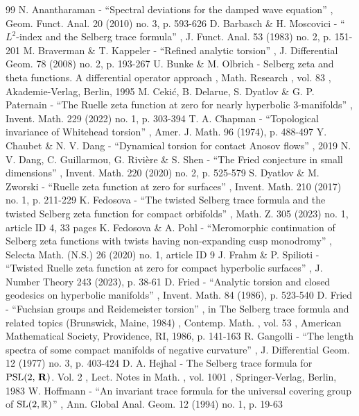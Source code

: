 \begin{thebibliography}{99}
 N. Anantharaman - “Spectral deviations for the damped wave equation” , Geom. Funct. Anal. 20 (2010) no. 3, p. 593-626
 D. Barbasch \& H. Moscovici - “$L^{2}$-index and the Selberg trace formula” , J. Funct. Anal. 53 (1983) no. 2, p. 151-201
 M. Braverman \& T. Kappeler - “Refined analytic torsion” , J. Differential Geom. 78 (2008) no. 2, p. 193-267
 U. Bunke \& M. Olbrich - Selberg zeta and theta functions. A differential operator approach , Math. Research , vol. 83 , Akademie-Verlag, Berlin, 1995
 M. Cekić, B. Delarue, S. Dyatlov \& G. P. Paternain - “The Ruelle zeta function at zero for nearly hyperbolic 3-manifolds” , Invent. Math. 229 (2022) no. 1, p. 303-394
 T. A. Chapman - “Topological invariance of Whitehead torsion” , Amer. J. Math. 96 (1974), p. 488-497
 Y. Chaubet \& N. V. Dang - “Dynamical torsion for contact Anosov flows” , 2019
 N. V. Dang, C. Guillarmou, G. Rivière \& S. Shen - “The Fried conjecture in small dimensions” , Invent. Math. 220 (2020) no. 2, p. 525-579
 S. Dyatlov \& M. Zworski - “Ruelle zeta function at zero for surfaces” , Invent. Math. 210 (2017) no. 1, p. 211-229
 K. Fedosova - “The twisted Selberg trace formula and the twisted Selberg zeta function for compact orbifolds” , Math. Z. 305 (2023) no. 1, article ID 4, 33 pages
 K. Fedosova \& A. Pohl - “Meromorphic continuation of Selberg zeta functions with twists having non-expanding cusp monodromy” , Selecta Math. (N.S.) 26 (2020) no. 1, article ID 9
 J. Frahm \& P. Spilioti - “Twisted Ruelle zeta function at zero for compact hyperbolic surfaces” , J. Number Theory 243 (2023), p. 38-61
 D. Fried - “Analytic torsion and closed geodesics on hyperbolic manifolds” , Invent. Math. 84 (1986), p. 523-540
 D. Fried - “Fuchsian groups and Reidemeister torsion” , in The Selberg trace formula and related topics (Brunswick, Maine, 1984) , Contemp. Math. , vol. 53 , American Mathematical Society, Providence, RI, 1986, p. 141-163
 R. Gangolli - “The length spectra of some compact manifolds of negative curvature” , J. Differential Geom. 12 (1977) no. 3, p. 403-424
 D. A. Hejhal - The Selberg trace formula for ${\rm PSL}(2,\,{\bf R})$. Vol. 2 , Lect. Notes in Math. , vol. 1001 , Springer-Verlag, Berlin, 1983
 W. Hoffmann - “An invariant trace formula for the universal covering group of ${\rm SL}(2,\mathbb{R})$” , Ann. Global Anal. Geom. 12 (1994) no. 1, p. 19-63

\end{thebibliography}
